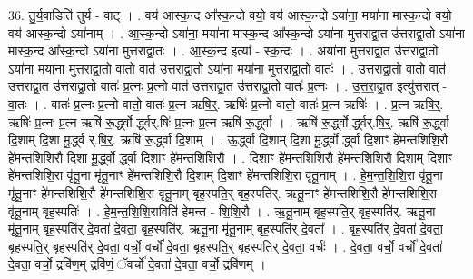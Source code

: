 \documentclass[17pt]{extarticle}
\begin{document}
36. तु॒र्य॒वाडिति॑ तुर्य - वाट् । . वय॑ आस्क॒न्द आ᳚स्क॒न्दो वयो॒ वय॑ आस्क॒न्दो ऽया॑ना॒ मया॑ना मास्क॒न्दो वयो॒ वय॑ आस्क॒न्दो ऽया॑नाम् । . आ॒स्क॒न्दो ऽया॑ना॒ मया॑ना मास्क॒न्द आ᳚स्क॒न्दो ऽया॑ना मुत्तराद्वा॒त उ॑त्तराद्वा॒तो ऽया॑ना मास्क॒न्द आ᳚स्क॒न्दो ऽया॑ना मुत्तराद्वा॒तः । . आ॒स्क॒न्द इत्या᳚ - स्क॒न्दः । . अया॑ना मुत्तराद्वा॒त उ॑त्तराद्वा॒तो ऽया॑ना॒ मया॑ना मुत्तराद्वा॒तो वातो॒ वात॑ उत्तराद्वा॒तो ऽया॑ना॒ मया॑ना मुत्तराद्वा॒तो वातः॑ । . उ॒त्त॒रा॒द्वा॒तो वातो॒ वात॑ उत्तराद्वा॒त उ॑त्तराद्वा॒तो वातः॑ प्र॒त्नः प्र॒त्नो वात॑ उत्तराद्वा॒त उ॑त्तराद्वा॒तो वातः॑ प्र॒त्नः । . उ॒त्त॒रा॒द्वा॒त इत्यु॑त्तरात् - वा॒तः । . वातः॑ प्र॒त्नः प्र॒त्नो वातो॒ वातः॑ प्र॒त्न ऋषि॒र्॒. ऋषिः॑ प्र॒त्नो वातो॒ वातः॑ प्र॒त्न ऋषिः॑ । . प्र॒त्न ऋषि॒र्॒. ऋषिः॑ प्र॒त्नः प्र॒त्न ऋषि॑ रू॒र्द्ध्वो र्द्ध्वर्.षिः॑ प्र॒त्नः प्र॒त्न ऋषि॑ रू॒र्द्ध्वा । . ऋषि॑ रू॒र्द्ध्वो र्द्ध्वर्.षि॒र्॒. ऋषि॑ रू॒र्द्ध्वा दि॒शाम् दि॒शा मू॒र्द्ध्व र्.षि॒र्॒. ऋषि॑ रू॒र्द्ध्वा दि॒शाम् । . ऊ॒र्द्ध्वा दि॒शाम् दि॒शा मू॒र्द्ध्वो र्द्ध्वा दि॒शाꣳ हे॑मन्तशिशि॒रौ हे॑मन्तशिशि॒रौ दि॒शा मू॒र्द्ध्वो र्द्ध्वा दि॒शाꣳ हे॑मन्तशिशि॒रौ । . दि॒शाꣳ हे॑मन्तशिशि॒रौ हे॑मन्तशिशि॒रौ दि॒शाम् दि॒शाꣳ हे॑मन्तशिशि॒रा वृ॑तू॒ना मृ॑तू॒नाꣳ हे॑मन्तशिशि॒रौ दि॒शाम् दि॒शाꣳ हे॑मन्तशिशि॒रा वृ॑तू॒नाम् । . हे॒म॒न्त॒शि॒शि॒रा वृ॑तू॒ना मृ॑तू॒नाꣳ हे॑मन्तशिशि॒रौ हे॑मन्तशिशि॒रा वृ॑तू॒नाम् बृह॒स्पति॒र् बृह॒स्पति॑र्. ऋतू॒नाꣳ हे॑मन्तशिशि॒रौ हे॑मन्तशिशि॒रा वृ॑तू॒नाम् बृह॒स्पतिः॑ । . हे॒म॒न्त॒शि॒शि॒राविति॑ हेमन्त - शि॒शि॒रौ । . ऋ॒तू॒नाम् बृह॒स्पति॒र् बृह॒स्पति॑र्. ऋतू॒ना मृ॑तू॒नाम् बृह॒स्पति॑र् दे॒वता॑ दे॒वता॒ बृह॒स्पति॑र्. ऋतू॒ना मृ॑तू॒नाम् बृह॒स्पति॑र् दे॒वता᳚ । . बृह॒स्पति॑र् दे॒वता॑ दे॒वता॒ बृह॒स्पति॒र् बृह॒स्पति॑र् दे॒वता॒ वर्चो॒ वर्चो॑ दे॒वता॒ बृह॒स्पति॒र् बृह॒स्पति॑र् दे॒वता॒ वर्चः॑ । . दे॒वता॒ वर्चो॒ वर्चो॑ दे॒वता॑ दे॒वता॒ वर्चो॒ द्रवि॑ण॒म् द्रवि॑णं॒ ॅवर्चो॑ दे॒वता॑ दे॒वता॒ वर्चो॒ द्रवि॑णम् । \newline
\end{document}
